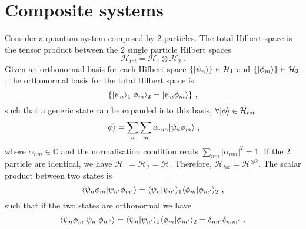 \section{Composite systems}

    Consider a quantum system composed by $2$ particles. The total Hilbert space is the tensor product between the $2$ single particle Hilbert spaces 
    \begin{equation*}
        \mathcal H_{tot} = \mathcal H_1 \otimes \mathcal H_2 ~. 
    \end{equation*}
    Given an orthonormal basis for each Hilbert space $\{\vert\psi_n\rangle\} \in \mathcal H_1$ and $\{\vert\phi_m\rangle\} \in \mathcal H_2$, the orthonormal basis for the total Hilbert space is 
    \begin{equation*}
        \{\vert\psi_n\rangle_1 \vert\phi_m\rangle_2 = \vert\psi_n \phi_m\rangle\} ~,
    \end{equation*}
    such that a generic state can be expanded into this basis, $\forall \vert\phi\rangle \in \mathcal H_{tot}$
    \begin{equation*}
        \vert\phi\rangle = \sum_n \sum_m \alpha_{nm} \vert\psi_n \phi_m\rangle ~,
    \end{equation*}
    where $\alpha_{nm} \in \mathbb C$ and the normalisation condition reads $\sum_{nm} |\alpha_{nm}|^2 = 1$. 
    If the $2$ particle are identical, we have $\mathcal H_1 = \mathcal H_2 = \mathcal H$. Therefore, $\mathcal H_{tot} = \mathcal H^{\otimes 2}$.
    The scalar product between two states is 
    \begin{equation*}
        \langle\psi_n \phi_m\vert\psi_{n'} \phi_{m'}\rangle = \langle\psi_n\vert\psi_{n'}\rangle_1 \langle\phi_m\vert\phi_{m'}\rangle_2 ~,
    \end{equation*}
    such that if the two states are orthonormal we have
    \begin{equation*}
        \langle\psi_n \phi_m\vert\psi_{n'} \phi_{m'}\rangle = \langle\psi_n\vert\psi_{n'}\rangle_1 \langle\phi_m\vert\phi_{m'}\rangle_2 = \delta_{nn'} \delta_{mm'} ~. 
    \end{equation*}
    
